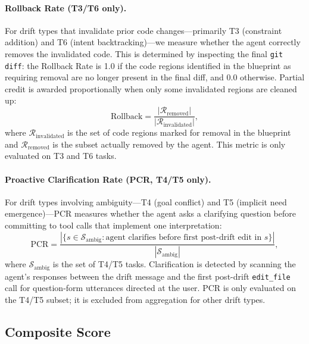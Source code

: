 \paragraph{Rollback Rate (T3/T6 only).}
For drift types that invalidate prior code changes---primarily T3 (constraint addition) and T6 (intent backtracking)---we measure whether the agent correctly removes the invalidated code. This is determined by inspecting the final \texttt{git diff}: the Rollback Rate is 1.0 if the code regions identified in the blueprint as requiring removal are no longer present in the final diff, and 0.0 otherwise. Partial credit is awarded proportionally when only some invalidated regions are cleaned up:
\begin{equation}
\label{eq:rollback}
\text{Rollback} = \frac{|\mathcal{R}_{\text{removed}}|}{|\mathcal{R}_{\text{invalidated}}|},
\end{equation}
where $\mathcal{R}_{\text{invalidated}}$ is the set of code regions marked for removal in the blueprint and $\mathcal{R}_{\text{removed}}$ is the subset actually removed by the agent. This metric is only evaluated on T3 and T6 tasks.

\paragraph{Proactive Clarification Rate (PCR, T4/T5 only).}
For drift types involving ambiguity---T4 (goal conflict) and T5 (implicit need emergence)---PCR measures whether the agent asks a clarifying question before committing to tool calls that implement one interpretation:
\begin{equation}
\label{eq:pcr}
\text{PCR} = \frac{|\{s \in \mathcal{S}_{\text{ambig}} : \text{agent clarifies before first post-drift edit in } s\}|}{|\mathcal{S}_{\text{ambig}}|},
\end{equation}
where $\mathcal{S}_{\text{ambig}}$ is the set of T4/T5 tasks. Clarification is detected by scanning the agent's responses between the drift message and the first post-drift \texttt{edit\_file} call for question-form utterances directed at the user. PCR is only evaluated on the T4/T5 subset; it is excluded from aggregation for other drift types.

\subsection{Composite Score}
\label{sec:composite}

